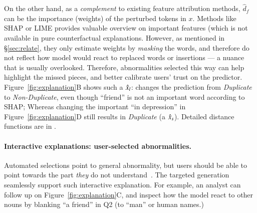 On the other hand, as a \emph{complement} to existing feature attribution methods, $\hat{d}_f$ can be the importance (weights) of the perturbed tokens in $x$.
Methods like SHAP or LIME provides valuable overview on important features (which is not available in pure counterfactual explanations.
However, as mentioned in \S\ref{sec:relate}, they only estimate weights by \emph{masking} the words, and therefore do not reflect how model would react to replaced words or insertions --- a nuance that is usually overlooked.
Therefore, abnormalities selected this way can help highlight the missed pieces, and better calibrate users' trust on the predictor. 
Figure~\ref{fig:explanation}B shows such a $\hat{x}_l$:  changes the prediction from \emph{Duplicate} to \emph{Non-Duplicate}, even though ``friend'' is not an important word according to SHAP; Whereas changing the important ``in depression'' in Figure~\ref{fig:explanation}D still results in \emph{Duplicate} (a $\hat{x}_s$).
Detailed distance functions are in \tofix{\S\ref{X}}.


\paragraph{Interactive explanations: user-selected abnormalities.}
Automated selections point to general abnormality, but users should be able to point towards the part \emph{they} do not understand~\cite{miller}.
The targeted generation seamlessly support such interactive explanation.
For example, an analyst can follow up on Figure~\ref{fig:explanation}C, and inspect how the model react to other nouns by blanking ``a friend'' in Q2 (\eg to ``man'' or human names.)



